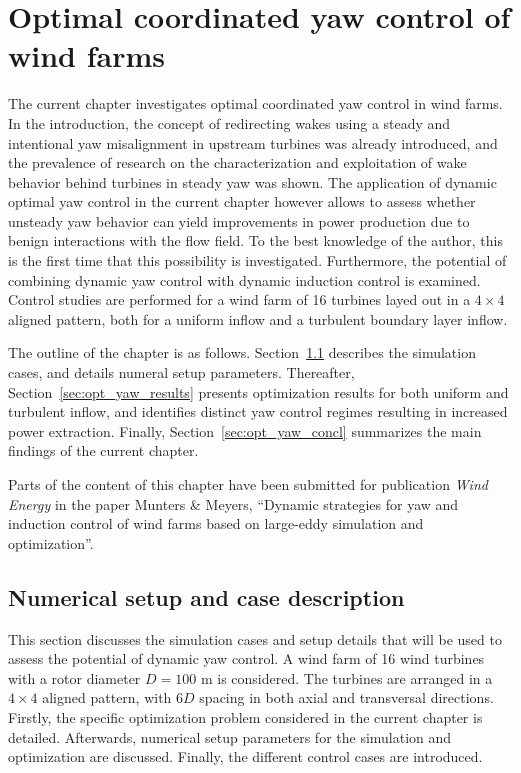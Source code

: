 \chapter{Optimal coordinated yaw control of wind farms}\label{ch:opt_yaw}

\def\mystrut{\rule{0pt}{1.1\normalbaselineskip}}

The current chapter investigates optimal coordinated yaw control in wind farms. In the introduction, the concept of redirecting wakes using a steady and intentional yaw misalignment in upstream turbines was already introduced, and the prevalence of research on the characterization and exploitation of wake behavior behind turbines in steady yaw was shown. The application of dynamic optimal yaw control in the current chapter however allows to assess whether unsteady yaw behavior can yield improvements in power production due to benign interactions with the flow field. To the best knowledge of the author, this is the first time that this possibility is investigated. Furthermore, the potential of combining dynamic yaw control with dynamic induction control is examined. Control studies are performed for a wind farm of 16 turbines layed out in a $4 \times 4$ aligned pattern, both for a uniform inflow and a turbulent boundary layer inflow. 

The outline of the chapter is as follows. Section~\ref{sec:opt_yaw_setup} describes the simulation cases, and details numeral setup parameters. Thereafter, Section~\ref{sec:opt_yaw_results} presents optimization results for both uniform and turbulent inflow, and identifies distinct yaw control regimes resulting in increased power extraction. Finally, Section~\ref{sec:opt_yaw_concl} summarizes the main findings of the current chapter. 

Parts of the content of this chapter have been submitted for publication \emph{Wind Energy} in the paper Munters \& Meyers, ``Dynamic strategies for yaw and induction control of wind farms based on large-eddy simulation and optimization''.


\section{Numerical setup and case description}\label{sec:opt_yaw_setup}
This section discusses the simulation cases and setup details that will be used to assess the potential of dynamic yaw control. A wind farm of 16 wind turbines with a rotor diameter $D = 100$ m is considered. The turbines are arranged in a $4 \times 4$ aligned pattern, with $6D$ spacing in both axial and transversal directions. Firstly, the specific optimization problem considered in the current chapter is detailed. Afterwards, numerical setup parameters for the simulation and optimization are discussed. Finally, the different control cases are introduced. 

